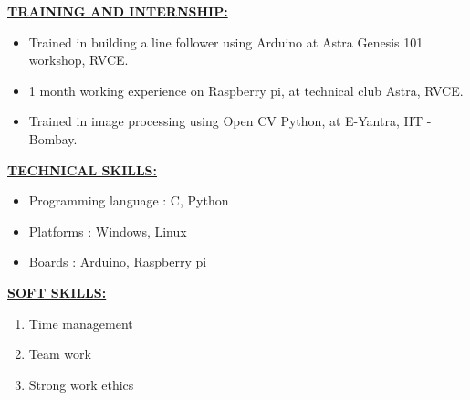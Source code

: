 \documentclass[letterpaper,11pt,oneside]{article}
\begin{document}
    \vspace{2ex}
    
    \textbf{\underline{\Large TRAINING AND INTERNSHIP:}}
    \begin{itemize}
    	\item Trained in building a line follower using Arduino at Astra Genesis 101 workshop, RVCE.
    	\item 1 month working experience on Raspberry pi, at technical club Astra, RVCE.
    	\item Trained in image processing using Open CV Python, at E-Yantra, IIT - Bombay.	
    \end{itemize}

\vspace{2ex}

\textbf{\underline{\Large TECHNICAL SKILLS:}} 
\begin{itemize}
	\item Programming language         :             C, Python
	\item Platforms                    :             Windows, Linux
	\item Boards                       :             Arduino, Raspberry pi 
\end{itemize}

\vspace{2ex}

\textbf{\underline{\Large SOFT SKILLS:}} 
\begin{enumerate}
	\item Time management
	\item Team work
	\item Strong work ethics
\end{enumerate}
\end{document}
